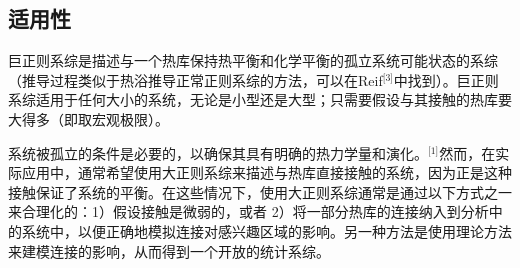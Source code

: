 \subsection{适用性}  
巨正则系综是描述与一个热库保持热平衡和化学平衡的孤立系统可能状态的系综（推导过程类似于热浴推导正常正则系综的方法，可以在Reif\(^\text{[3]}\)中找到）。巨正则系综适用于任何大小的系统，无论是小型还是大型；只需要假设与其接触的热库要大得多（即取宏观极限）。

系统被孤立的条件是必要的，以确保其具有明确的热力学量和演化。\(^\text{[1]}\)然而，在实际应用中，通常希望使用大正则系综来描述与热库直接接触的系统，因为正是这种接触保证了系统的平衡。在这些情况下，使用大正则系综通常是通过以下方式之一来合理化的：1）假设接触是微弱的，或者 2）将一部分热库的连接纳入到分析中的系统中，以便正确地模拟连接对感兴趣区域的影响。另一种方法是使用理论方法来建模连接的影响，从而得到一个开放的统计系综。